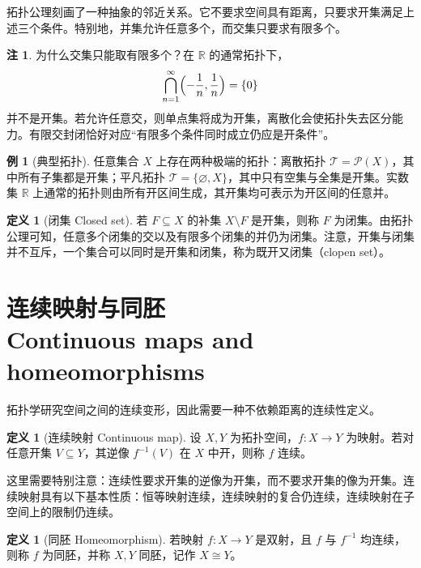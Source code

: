 \documentclass[12pt,a4paper,UTF8]{ctexart}
\newcommand{\R}{\mathbb{R}}
\theoremstyle{definition}
\newtheorem{definition}[theorem]{定义}
\newtheorem{example}[theorem]{例}
\newtheorem{remark}[theorem]{注}
\begin{document}
拓扑公理刻画了一种抽象的邻近关系。它不要求空间具有距离，只要求开集满足上述三个条件。特别地，并集允许任意多个，而交集只要求有限多个。

\begin{remark}
为什么交集只能取有限多个？在 $\R$ 的通常拓扑下，
\[
\bigcap_{n=1}^{\infty}\Bigl(-\frac1n,\frac1n\Bigr)=\{0\}
\]
并不是开集。若允许任意交，则单点集将成为开集，离散化会使拓扑失去区分能力。有限交封闭恰好对应“有限多个条件同时成立仍应是开条件”。
\end{remark}

\begin{example}[典型拓扑]
任意集合 $X$ 上存在两种极端的拓扑：离散拓扑 $\mathcal T=\mathcal P(X)$，其中所有子集都是开集；平凡拓扑 $\mathcal T=\{\varnothing,X\}$，其中只有空集与全集是开集。实数集 $\R$ 上通常的拓扑则由所有开区间生成，其开集均可表示为开区间的任意并。
\end{example}

\begin{definition}[闭集 Closed set]
若 $F\subseteq X$ 的补集 $X\setminus F$ 是开集，则称 $F$ 为闭集。由拓扑公理可知，任意多个闭集的交以及有限多个闭集的并仍为闭集。注意，开集与闭集并不互斥，一个集合可以同时是开集和闭集，称为既开又闭集（clopen set）。
\end{definition}

\section{连续映射与同胚\\
Continuous maps and homeomorphisms}

拓扑学研究空间之间的连续变形，因此需要一种不依赖距离的连续性定义。

\begin{definition}[连续映射 Continuous map]
设 $X,Y$ 为拓扑空间，$f:X\to Y$ 为映射。若对任意开集 $V\subseteq Y$，其逆像 $f^{-1}(V)$ 在 $X$ 中开，则称 $f$ 连续。
\end{definition}

这里需要特别注意：连续性要求开集的逆像为开集，而不要求开集的像为开集。连续映射具有以下基本性质：恒等映射连续，连续映射的复合仍连续，连续映射在子空间上的限制仍连续。

\begin{definition}[同胚 Homeomorphism]
若映射 $f:X\to Y$ 是双射，且 $f$ 与 $f^{-1}$ 均连续，则称 $f$ 为同胚，并称 $X,Y$ 同胚，记作 $X\cong Y$。
\end{definition}
\end{document}
